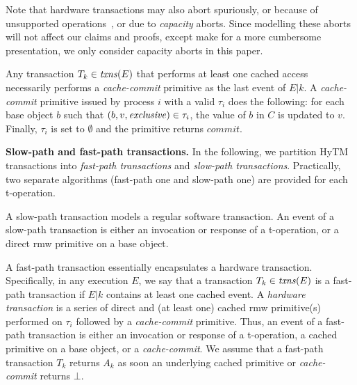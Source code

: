 Note that hardware transactions may also abort spuriously, or because of unsupported operations~\cite{Rei12}, or due to \emph{capacity} aborts. 
Since modelling these aborts will not affect our claims and proofs, except make for a more cumbersome presentation, we only consider capacity aborts in this paper. 

Any transaction $T_k \in \ms{txns}(E)$ that performs at least one cached access necessarily performs a \emph{cache-commit} primitive as the last event of $E|k$. 
A \emph{cache-commit} primitive issued by process $i$ with
a valid $\tau_i$ does the following: for each base object $b$ such that $(b,v,\mathit{exclusive}) \in \tau_i$, the value of $b$ in $C$ is updated to $v$. 
Finally, $\tau_i$ is set to $\emptyset$ and the primitive 
returns $\textit{commit}$. 

\vspace{1mm}\noindent\textbf{Slow-path and fast-path transactions.}
In the following, we partition HyTM transactions into \emph{fast-path transactions} and \emph{slow-path transactions}.
Practically, two separate algorithms (fast-path one and slow-path one) 
are provided for each t-operation. 

A slow-path transaction models a regular software transaction.
An event of a slow-path transaction is either an invocation or response of a t-operation, or
a direct rmw primitive on a base object. 

A fast-path transaction essentially encapsulates a hardware transaction. Specifically, in any execution $E$,
we say that a transaction $T_k\in \ms{txns}(E)$ is a fast-path transaction if $E|k$ contains at least one cached event.
A \emph{hardware transaction} is a series of direct and (at least one) cached rmw primitive(s) performed on $\tau_i$ followed by
a \emph{cache-commit} primitive. 
Thus, an event of a fast-path transaction is either an invocation or response of a t-operation, 
a cached primitive on a base object, or a \emph{cache-commit}.
We assume that a fast-path transaction $T_k$ returns $A_k$
as soon an underlying cached primitive or \emph{cache-commit} returns $\bot$. 
%
%